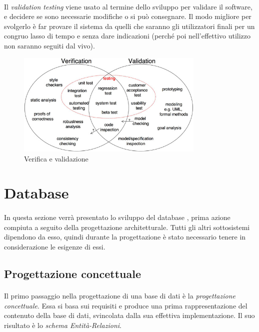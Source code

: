 \documentclass[11pt,a4paper,english]{article}
\begin{document}
\paragraph{} Il \emph{validation testing} viene usato al termine dello sviluppo per validare il software, e decidere se sono necessarie modifiche o si può consegnare. Il modo migliore per svolgerlo è far provare il sistema da quelli che saranno gli utilizzatori finali per un congruo lasso di tempo e senza dare indicazioni (perché poi nell'effettivo utilizzo non saranno seguiti dal vivo). 

\begin{figure}[H]
    \centering
    \includegraphics[width=0.8\textwidth]{img/verifica_validazione.jpg}
    \caption{Verifica e validazione}
\end{figure}


\newpage
\section{Database}

\paragraph{} In questa sezione verrà presentato lo sviluppo del database \cite{db}, prima azione compiuta a seguito della progettazione architetturale. Tutti gli altri sottosistemi dipendono da esso, quindi durante la progettazione è stato necessario tenere in considerazione le esigenze di essi.

\subsection{Progettazione concettuale}

\paragraph{} Il primo passaggio nella progettazione di una base di dati è la \emph{progettazione concettuale}. Essa si basa sui requisiti e produce una prima rappresentazione del contenuto della base di dati, svincolata dalla sua effettiva implementazione. Il suo risultato è lo \emph{schema Entità-Relazioni}. 
\end{document}
